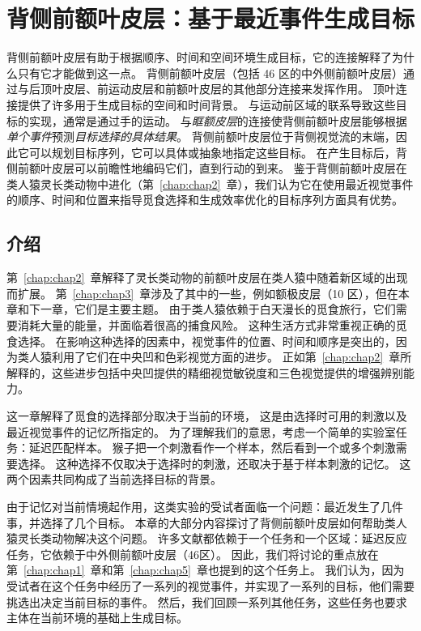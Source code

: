 \chapter{背侧前额叶皮层：基于最近事件生成目标} \label{chap:chap6}

背侧前额叶皮层有助于根据顺序、时间和空间环境生成目标，它的连接解释了为什么只有它才能做到这一点。
背侧前额叶皮层（包括 46 区的中外侧前额叶皮层）通过与后顶叶皮层、前运动皮层和前额叶皮层的其他部分连接来发挥作用。
顶叶连接提供了许多用于生成目标的空间和时间背景。
与运动前区域的联系导致这些目标的实现，通常是通过手的运动。
与\textit{眶额皮层}的连接使背侧前额叶皮层能够根据\textit{单个事件}预测\textit{目标选择的具体结果}。
背侧前额叶皮层位于背侧视觉流的末端，因此它可以规划目标序列，它可以具体或抽象地指定这些目标。
在产生目标后，背侧前额叶皮层可以前瞻性地编码它们，直到行动的到来。
鉴于背侧前额叶皮层在类人猿灵长类动物中进化（第~\ref{chap:chap2}~章），我们认为它在使用最近视觉事件的顺序、时间和位置来指导觅食选择和生成效率优化的目标序列方面具有优势。



\section{介绍}

第~\ref{chap:chap2}~章解释了灵长类动物的前额叶皮层在类人猿中随着新区域的出现而扩展。
第~\ref{chap:chap3}~章涉及了其中的一些，例如额极皮层（10 区），但在本章和下一章，它们是主要主题。
由于类人猿依赖于白天漫长的觅食旅行，它们需要消耗大量的能量，并面临着很高的捕食风险。
这种生活方式非常重视正确的觅食选择。
在影响这种选择的因素中，视觉事件的位置、时间和顺序是突出的，因为类人猿利用了它们在中央凹和色彩视觉方面的进步。
正如第~\ref{chap:chap2}~章所解释的，这些进步包括中央凹提供的精细视觉敏锐度和三色视觉提供的增强辨别能力。


这一章解释了觅食的选择部分取决于当前的环境，
这是由选择时可用的刺激以及最近视觉事件的记忆所指定的。
为了理解我们的意思，考虑一个简单的实验室任务：延迟匹配样本。
猴子把一个刺激看作一个样本，然后看到一个或多个刺激需要选择。
这种选择不仅取决于选择时的刺激，还取决于基于样本刺激的记忆。
这两个因素共同构成了当前选择目标的背景。


由于记忆对当前情境起作用，这类实验的受试者面临一个问题：最近发生了几件事，并选择了几个目标。
本章的大部分内容探讨了背侧前额叶皮层如何帮助类人猿灵长类动物解决这个问题。
许多文献都依赖于一个任务和一个区域：延迟反应任务，它依赖于中外侧前额叶皮层（46区）。
因此，我们将讨论的重点放在第~\ref{chap:chap1}~章和第~\ref{chap:chap5}~章也提到的这个任务上。
我们认为，因为受试者在这个任务中经历了一系列的视觉事件，并实现了一系列的目标，他们需要挑选出决定当前目标的事件。
然后，我们回顾一系列其他任务，这些任务也要求主体在当前环境的基础上生成目标。



